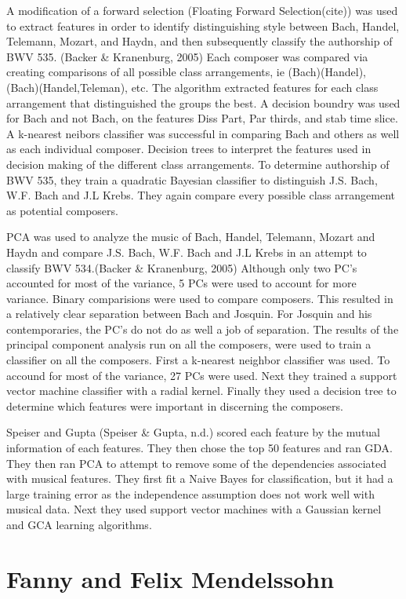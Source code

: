 \documentclass[12pt,twoside]{reedthesis}
\theoremstyle{definition}
\theoremstyle{definition}
\theoremstyle{definition}
\theoremstyle{remark}
\begin{document}
A modification of a forward selection (Floating Forward Selection(cite))
was used to extract features in order to identify distinguishing style
between Bach, Handel, Telemann, Mozart, and Haydn, and then subsequently
classify the authorship of BWV 535. (Backer \& Kranenburg, 2005) Each
composer was compared via creating comparisons of all possible class
arrangements, ie (Bach)(Handel), (Bach)(Handel,Teleman), etc. The
algorithm extracted features for each class arrangement that
distinguished the groups the best. A decision boundry was used for Bach
and not Bach, on the features Diss Part, Par thirds, and stab time
slice. A k-nearest neibors classifier was successful in comparing Bach
and others as well as each individual composer. Decision trees to
interpret the features used in decision making of the different class
arrangements. To determine authorship of BWV 535, they train a quadratic
Bayesian classifier to distinguish J.S. Bach, W.F. Bach and J.L Krebs.
They again compare every possible class arrangement as potential
composers.

PCA was used to analyze the music of Bach, Handel, Telemann, Mozart and
Haydn and compare J.S. Bach, W.F. Bach and J.L Krebs in an attempt to
classify BWV 534.(Backer \& Kranenburg, 2005) Although only two PC's
accounted for most of the variance, 5 PCs were used to account for more
variance. Binary comparisions were used to compare composers. This
resulted in a relatively clear separation between Bach and Josquin. For
Josquin and his contemporaries, the PC's do not do as well a job of
separation. The results of the principal component analysis run on all
the composers, were used to train a classifier on all the composers.
First a k-nearest neighbor classifier was used. To accound for most of
the variance, 27 PCs were used. Next they trained a support vector
machine classifier with a radial kernel. Finally they used a decision
tree to determine which features were important in discerning the
composers.

Speiser and Gupta (Speiser \& Gupta, n.d.) scored each feature by the
mutual information of each features. They then chose the top 50 features
and ran GDA. They then ran PCA to attempt to remove some of the
dependencies associated with musical features. They first fit a Naive
Bayes for classification, but it had a large training error as the
independence assumption does not work well with musical data. Next they
used support vector machines with a Gaussian kernel and GCA learning
algorithms.

\section{Fanny and Felix Mendelssohn}\label{fanny-and-felix-mendelssohn}
\end{document}
